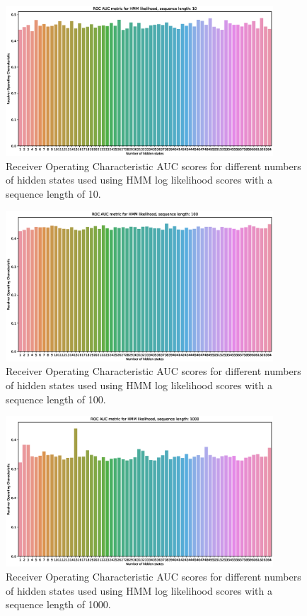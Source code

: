 \documentclass[journal]{IEEEtran}
\begin{document}
\begin{figure}[h]
 \centering
 \includegraphics[width=10cm,keepaspectratio=true]{./roc_hmm_score_10.eps}
 \caption{Receiver Operating Characteristic AUC scores for different numbers of hidden states used using HMM log likelihood scores with a sequence length of 10.}
 \label{figure:roc_log_likelihoods_10}
\end{figure}

\begin{figure}[h]
 \centering
 \includegraphics[width=10cm,keepaspectratio=true]{./roc_hmm_score_100.eps}
 \caption{Receiver Operating Characteristic AUC scores for different numbers of hidden states used using HMM log likelihood scores with a sequence length of 100.}
 \label{figure:roc_log_likelihoods_100}
\end{figure}

\begin{figure}[h]
 \centering
 \includegraphics[width=10cm,keepaspectratio=true]{./roc_hmm_score_1000.eps}
 \caption{Receiver Operating Characteristic AUC scores for different numbers of hidden states used using HMM log likelihood scores with a sequence length of 1000.}
 \label{figure:roc_log_likelihoods_1000}
\end{figure}
\end{document}
